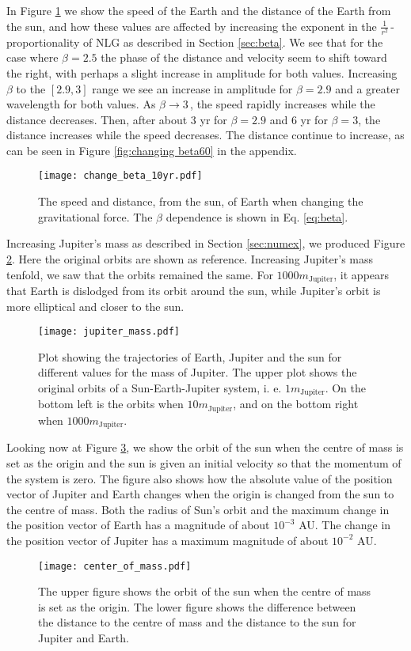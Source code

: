 In Figure \ref{fig:changing beta} we show the speed of the Earth and the distance of the Earth from the sun, and how these values are affected by increasing the exponent in the $\frac{1}{r^2}\,$-proportionality of NLG as described in Section \ref{sec:beta}. We see that for the case where $\beta=2.5$ the phase of the distance and velocity seem to shift toward the right, with perhaps a slight increase in amplitude for both values. Increasing $\beta$ to the $[2.9, 3]$ range we see an increase in amplitude for $\beta = 2.9$ and a greater wavelength for both values. As $\beta \rightarrow 3\,$, the speed rapidly increases while the distance decreases. Then, after about 3 yr for $\beta = 2.9$ and 6 yr for $\beta = 3$, the distance increases while the speed decreases. The distance continue to increase, as can be seen in Figure \ref{fig:changing beta60} in the appendix.
\begin{figure}[htbp]
	\centering
	\texttt{[image: change\_beta\_10yr.pdf]}
	\caption{The speed and distance, from the sun, of Earth when changing the gravitational force. The $\beta$ dependence is shown in Eq. \ref{eq:beta}.}
	\label{fig:changing beta}
\end{figure}

Increasing Jupiter's mass as described in Section \ref{sec:numex}, we produced Figure \ref{fig:jupiter mass}. Here the original orbits are shown as reference. Increasing Jupiter's mass tenfold, we saw that the orbits remained the same.
For $1000m_{\text{Jupiter}}$, it appears that Earth is dislodged from its orbit around the sun, while Jupiter's orbit is more elliptical and closer to the sun.
\begin{figure}[htbp]
	\centering
	\texttt{[image: jupiter\_mass.pdf]}
	\caption{Plot showing the trajectories of Earth, Jupiter and the sun for different values for the mass of Jupiter. The upper plot shows the original orbits of a Sun-Earth-Jupiter system, i. e. $1m_{\text{Jupiter}}$. On the bottom left is the orbits when $10m_{\text{Jupiter}}$, and on the bottom right when $1000m_{\text{Jupiter}}$.}
	\label{fig:jupiter mass}
\end{figure}

Looking now at Figure \ref{fig:centre of mass}, we show the orbit of the sun when the centre of mass is set as the origin and the sun is given an initial velocity so that the momentum of the system is zero. The figure also shows how the absolute value of the position vector of Jupiter and Earth changes when the origin is changed from the sun to the centre of mass. Both the radius of Sun's orbit and the maximum change in the position vector of Earth has a magnitude of about $10^{-3}$ AU. The change in the position vector of Jupiter has a maximum magnitude of about $10^{-2}$ AU.
\begin{figure}[htbp]
	\centering
	\texttt{[image: center\_of\_mass.pdf]}
	\caption{The upper figure shows the orbit of the sun when the centre of mass is set as the origin. The lower figure shows the difference between the distance to the centre of mass and the distance to the sun for Jupiter and Earth.}
	\label{fig:centre of mass}
\end{figure}

